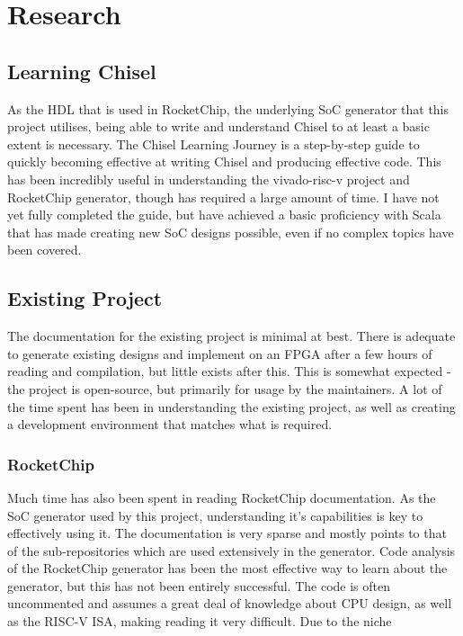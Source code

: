 \section{Research}
\label{sec:background}
\subsection{Learning Chisel}
As the HDL that is used in RocketChip\cite{}, the underlying SoC generator that this project utilises, being able to write and understand Chisel to at least a basic extent is necessary. The Chisel Learning Journey\cite{} is a step-by-step guide to quickly becoming effective at writing Chisel and producing effective code. This has been incredibly useful in understanding the vivado-risc-v project and RocketChip generator, though has required a large amount of time. I have not yet fully completed the guide, but have achieved a basic proficiency with Scala that has made creating new SoC designs possible, even if no complex topics have been covered.

\subsection{Existing Project}
The documentation for the existing project is minimal at best. There is adequate to generate existing designs and implement on an FPGA after a few hours of reading and compilation, but little exists after this. This is somewhat expected - the project is open-source, but primarily for usage by the maintainers. A lot of the time spent has been in understanding the existing project, as well as creating a development environment that matches what is required. 

\subsubsection{RocketChip}
Much time has also been spent in reading RocketChip documentation\cite{}. As the SoC generator used by this project, understanding it's capabilities is key to effectively using it. The documentation is very sparse and mostly points to that of the sub-repositories which are used extensively in the generator. Code analysis of the RocketChip generator has been the most effective way to learn about the generator, but this has not been entirely successful. The code is often uncommented and assumes a great deal of knowledge about CPU design, as well as the RISC-V ISA, making reading it very difficult. Due to the niche 

